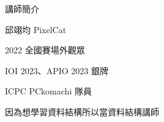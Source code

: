 \begin{frame}
    \titlepage
\end{frame}

\begin{frame}{講師簡介}
    \begin{itemize}
        \item 邱翊均 PixelCat
        \item 2022 全國賽場外觀眾
        \item IOI 2023、APIO 2023 銀牌
        \item ICPC PCkomachi 隊員
         {
            \item 因為想學習資料結構所以當資料結構講師
        }
    \end{itemize}
\end{frame}

\begin{frame}{\AkoEmoji}
    \tableofcontents
\end{frame}

